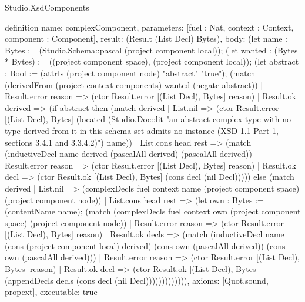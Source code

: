\begin{lexlean}{Studio.XsdComponents}
\begin{semanticmodule}
definition{
  name: complexComponent,
  parameters: [fuel : Nat, context : Context, component : Component],
  result: (Result (List Decl) Bytes),
  body: (let name : Bytes := (Studio.Schema::pascal (project component local)); (let wanted : (Bytes * Bytes) := ((project component space), (project component local)); (let abstract : Bool := (attrIs (project component node) "abstract" "true"); (match (derivedFrom (project context components) wanted (negate abstract))
    | Result.error reason => (ctor Result.error [(List Decl), Bytes] reason)
    | Result.ok derived => (if abstract then (match derived
      | List.nil => (ctor Result.error [(List Decl), Bytes] (located (Studio.Doc::lit "an abstract complex type with no type derived from it in this schema set admits no instance (XSD 1.1 Part 1, sections 3.4.1 and 3.3.4.2)") name))
      | List.cons head rest => (match (inductiveDecl name derived (pascalAll derived) (pascalAll derived))
        | Result.error reason => (ctor Result.error [(List Decl), Bytes] reason)
        | Result.ok decl => (ctor Result.ok [(List Decl), Bytes] (cons decl (nil Decl))))) else (match derived
      | List.nil => (complexDecls fuel context name (project component space) (project component node))
      | List.cons head rest => (let own : Bytes := (contentName name); (match (complexDecls fuel context own (project component space) (project component node))
        | Result.error reason => (ctor Result.error [(List Decl), Bytes] reason)
        | Result.ok decls => (match (inductiveDecl name (cons (project component local) derived) (cons own (pascalAll derived)) (cons own (pascalAll derived)))
          | Result.error reason => (ctor Result.error [(List Decl), Bytes] reason)
          | Result.ok decl => (ctor Result.ok [(List Decl), Bytes] (appendDecls decls (cons decl (nil Decl))))))))))))),
  axioms: [Quot.sound, propext],
  executable: true
}


\end{semanticmodule}
\end{lexlean}
